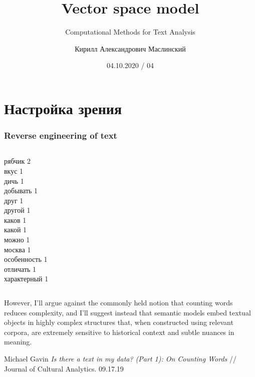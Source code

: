 \documentclass[svgnames]{beamer}
\title[CMTA 04] %
{Vector space model}
\subtitle
{Computational Methods for Text Analysis} %
\author%
{Кирилл Александрович Маслинский}
\institute%
{НИУ ВШЭ Санкт-Петербург}
\date%
{04.10.2020 / 04}
\begin{document}
\begin{frame}
  \titlepage
\end{frame}

\section{Настройка зрения}

\begin{frame}
  \frametitle{Reverse engineering of text}
    \begin{columns}
      рябчик 2\\
      вкус 1\\
      дичь 1\\
      добывать 1\\
      друг 1\\
      другой 1\\
      каков 1\\
      какой 1\\
      можно 1\\
      москва 1\\
      особенность 1\\
      отличать 1\\
      характерный 1\\
    \end{columns}
\end{frame}

\begin{frame}
  \begin{block}{}
    However, I'll argue against the commonly held notion that counting
    words reduces complexity, and I'll suggest instead that semantic
    models embed textual objects in highly complex structures that,
    when constructed using relevant corpora, are extremely sensitive
    to historical context and subtle nuances in meaning.
  \end{block}
  
Michael Gavin \textit{Is there a text in my data? (Part 1): On
Counting Words} // Journal of Cultural Analytics. 09.17.19 
\end{frame}
\end{document}
